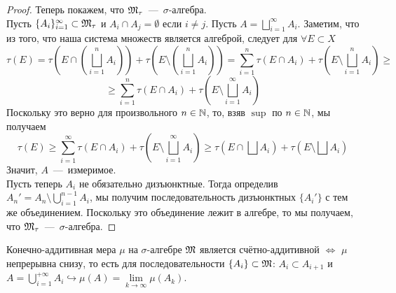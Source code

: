 \begin{proof}
Теперь покажем, что $\mathfrak{M}_\tau$~---~$\sigma$-алгебра. \\ Пусть $\{A_i\}_{i = 1}^\infty \subset \mathfrak{M}_\tau$ и $A_i \cap A_j = \emptyset$ если $i \neq j$. Пусть $A = \bigsqcup\limits_{i = 1}^\infty A_i$. Заметим, что из того, что наша система множеств является алгеброй, следует для $\forall E \subset X$ \[\tau(E) = \tau(E \cap (\bigsqcup\limits_{i = 1}^n A_i)) + \tau(E \setminus (\bigsqcup\limits_{i = 1}^n A_i)) = \sum\limits_{i = 1}^n \tau(E \cap A_i) + \tau(E \setminus \bigsqcup_{i = 1}^n A_i) \geq\]
\[\geq \sum\limits_{i = 1}^n \tau(E \cap A_i) + \tau(E \setminus \bigsqcup\limits_{i = 1}^\infty A_i)\]
Поскольку это верно для произвольного $n \in \mathbb{N}$, то, взяв $\sup$ по $n \in \mathbb{N}$, мы получаем \[\tau(E) \geq \sum\limits_{i = 1}^\infty \tau(E \cap A_i) + \tau(E \setminus \bigsqcup\limits_{i = 1}^\infty A_i) \geq \tau(E \cap \bigsqcup A_i) + \tau(E \setminus \bigsqcup A_i)\]
Значит, $A$~---~измеримое. \\
Пусть теперь $A_i$ не обязательно дизъюнктные. Тогда определив $A_n' = A_n \setminus \bigcup\limits_{i = 1}^{n-1} A_i$, мы получим последовательность дизъюнктных $\{A_i'\}$ с тем же объединением. Поскольку это объединение лежит в алгебре, то мы получаем, что $\mathfrak{M}_\tau$~---~$\sigma$-алгебра.
\end{proof}
\begin{theorem}
Конечно-аддитивная мера $\mu$ на $\sigma$-алгебре $\mathfrak{M}$ является счётно-аддитивной $\Longleftrightarrow$ $\mu$ непрерывна снизу, то есть для последовательности $\{ A_i\} \subset \mathfrak{M}$: $A_i \subset A_{i + 1}$ и $A = \bigcup\limits_{i = 1}^{+\infty} A_i \hookrightarrow \mu(A) = \lim\limits_{k \rightarrow \infty} \mu(A_k)$.
\end{theorem}
